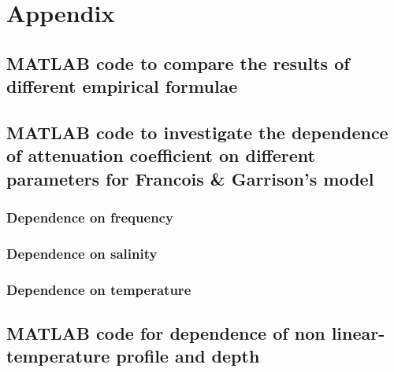 
\chapter{Appendix} \label{Appendix}

\section{ MATLAB code to compare the results of different empirical formulae } \label{MATLAB code to compare the results of different empirical formulae}




\section{MATLAB code to investigate the dependence of attenuation coefficient on different parameters for Francois \& Garrison's model} \label{MATLAB code to investigate the dependence of attenuation coefficient on different parameters for Francois & Garrison's model} 

\subsection{Dependence on frequency} \label{Dependence on frequency} 


\subsection{Dependence on salinity} \label{Dependence on salinity} 


\subsection{Dependence on temperature} \label{Dependence on temperature} 


\section{ MATLAB code for dependence of non linear-temperature profile and depth} \label{ MATLAB code for dependence of non-linear temperature profile and depth}

